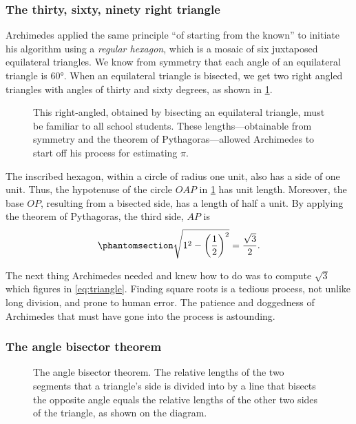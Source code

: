 \documentclass[
  a4paper,
]{article}
\begin{document}
\subsubsection{The thirty, sixty, ninety right
triangle}\label{the-thirty-sixty-ninety-right-triangle}

Archimedes applied the same principle ``of starting from the known'' to
initiate his algorithm using a \emph{regular hexagon}, which is a mosaic
of six juxtaposed equilateral triangles. We know from symmetry that each
angle of an equilateral triangle is \(60°\). When an equilateral
triangle is bisected, we get two right angled triangles with angles of
thirty and sixty degrees, as shown in \cref{fig:thirty-sixty}.

\begin{figure}
\centering

\caption{This right-angled, obtained by bisecting an equilateral
triangle, must be familiar to all school students. These
lengths---obtainable from symmetry and the theorem of
Pythagoras---allowed Archimedes to start off his process for estimating
\(\pi\).}\label{fig:thirty-sixty}
\end{figure}

The inscribed hexagon, within a circle of radius one unit, also has a
side of one unit. Thus, the hypotenuse of the circle \(OAP\) in
\cref{fig:thirty-sixty} has unit length. Moreover, the base \(OP\),
resulting from a bisected side, has a length of half a unit. By applying
the theorem of Pythagoras, the third side, \(AP\) is
\begin{equation}\phantomsection\label{eq:triangle}{
\sqrt{1^2 - \left(\frac{1}{2}\right)^2} = \frac{\sqrt{3}}{2}.
}\end{equation}

The next thing Archimedes needed and knew how to do was to compute
\(\sqrt{3}\) which figures in \cref{eq:triangle}. Finding square roots
is a tedious process, not unlike long division, and prone to human
error. The patience and doggedness of Archimedes that must have gone
into the process is astounding.

\subsubsection{The angle bisector
theorem}\label{the-angle-bisector-theorem}

\begin{figure}
\centering

\caption{The angle bisector theorem. The relative lengths of the two
segments that a triangle's side is divided into by a line that bisects
the opposite angle equals the relative lengths of the other two sides of
the triangle, as shown on the diagram.}\label{fig:angle-bisect}
\end{figure}
\end{document}
